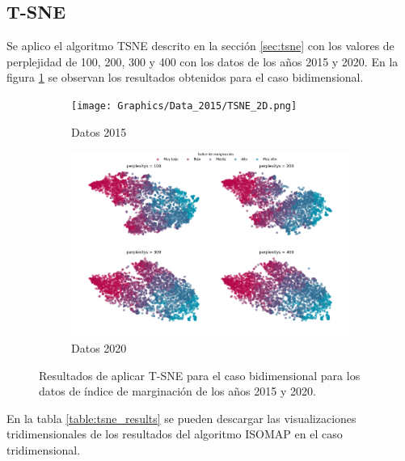 \subsection{T-SNE}

Se aplico el algoritmo TSNE descrito en la sección \ref{sec:tsne} con los valores de perplejidad de 100, 200, 300 y 400 con los datos de los años 2015 y 2020. En la figura \ref{fig:tsne_2d} se observan los resultados obtenidos para el caso bidimensional.

\begin{figure}[H]
    \centering
    \begin{subfigure}{8.4cm}
        \texttt{[image: Graphics/Data\_2015/TSNE\_2D.png]}
        \caption{Datos 2015}
    \end{subfigure}
    \begin{subfigure}{8.4cm}
        \includegraphics[width=1\linewidth]{Graphics/Data_2020/TSNE_2D.png}
        \caption{Datos 2020}
    \end{subfigure}
    \caption{Resultados de aplicar T-SNE para el caso bidimensional para los datos de índice de marginación de los años 2015 y 2020.}
    \label{fig:tsne_2d}
\end{figure}

En la tabla \ref{table:tsne_results} se pueden descargar las visualizaciones tridimensionales de los resultados del algoritmo ISOMAP en el caso tridimensional.

